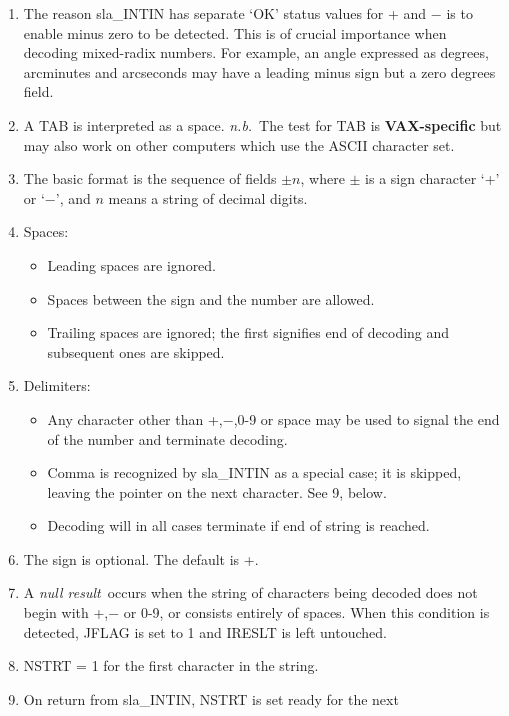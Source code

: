 {
 \begin{enumerate}
 \item The reason sla\_INTIN has separate `OK' status values
       for + and $-$ is to enable minus zero to be detected.
       This is of crucial importance
       when decoding mixed-radix numbers.  For example, an angle
       expressed as degrees, arcminutes and arcseconds may have a
       leading minus sign but a zero degrees field.
 \item A TAB is interpreted as a space. {\it n.b.}\ The test for TAB is
       {\bf VAX-specific} but may also work on other computers
       which use the ASCII character set.
 \item The basic format is the sequence of fields $\pm n$,
       where $\pm$ is a sign
       character `+' or `$-$', and $n$ means a string of decimal digits.
 \item Spaces:
       \begin{itemize}
       \item Leading spaces are ignored.
       \item Spaces between the sign and the number are allowed.
       \item Trailing spaces are ignored;  the first signifies
             end of decoding and subsequent ones are skipped.
       \end{itemize}
 \item Delimiters:
       \begin{itemize}
       \item Any character other than +,$-$,0-9 or space may be
             used to signal the end of the number and terminate decoding.
       \item Comma is recognized by sla\_INTIN as a special case; it
             is skipped, leaving the pointer on the next character.  See
             9, below.
       \item Decoding will in all cases terminate if end of string
             is reached.
       \end{itemize}
 \item The sign is optional.  The default is +.
 \item A {\it null result}\, occurs when the string of characters
       being decoded does not begin with +,$-$ or 0-9, or
       consists entirely of spaces.  When this condition is
       detected, JFLAG is set to 1 and IRESLT is left untouched.
 \item NSTRT = 1 for the first character in the string.
 \item On return from sla\_INTIN, NSTRT is set ready for the next

\end{enumerate}}
